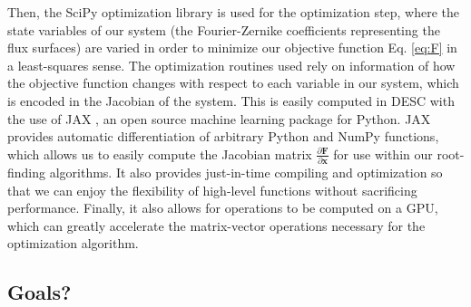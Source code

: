 \documentclass{article}
\begin{document}
Then, the SciPy \cite{SciPy} optimization library is used for the optimization step, where the state variables of our system (the Fourier-Zernike coefficients representing the flux surfaces) are varied in order to minimize our objective function Eq. \eqref{eq:F} in a least-squares sense.
The optimization routines used rely on information of how the objective function changes with respect to each variable in our system, which is encoded in the Jacobian of the system. This is easily computed in DESC with the use of JAX \cite{JAX}, an open source machine learning package for Python.
JAX provides automatic differentiation of arbitrary Python and NumPy functions, which allows us to easily compute the Jacobian matrix $\frac{\partial\mathbf{F}}{\partial\mathbf{x}}$ for use within our root-finding algorithms.
It also provides just-in-time compiling and optimization so that we can enjoy the flexibility of high-level functions without sacrificing performance. Finally, it also allows for operations to be computed on a GPU, which can greatly accelerate the matrix-vector operations necessary for the optimization algorithm.

\subsection{Goals?}
\end{document}
